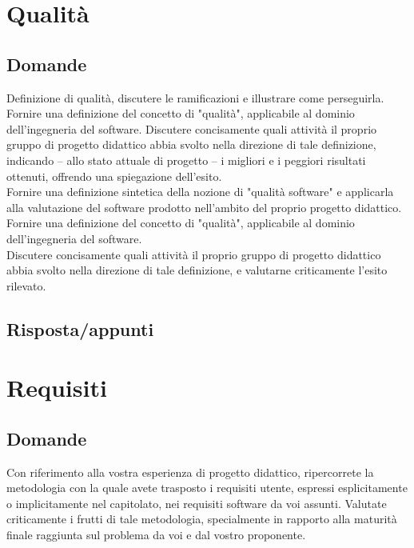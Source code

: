 \section{Qualità}

\subsection*{Domande}
Definizione di qualità, discutere le ramificazioni e illustrare come perseguirla.\\

Fornire una definizione del concetto di "qualità", applicabile al dominio dell'ingegneria del software. 
Discutere concisamente quali attività il proprio gruppo di progetto didattico abbia svolto nella direzione di tale definizione, indicando – allo stato attuale di progetto – i migliori e i peggiori risultati ottenuti, offrendo una spiegazione dell'esito.\\

Fornire una definizione sintetica della nozione di "qualità software" e applicarla alla valutazione del software prodotto nell'ambito del proprio progetto didattico.\\

Fornire una definizione del concetto di "qualità", applicabile al dominio dell'ingegneria del software. \\

Discutere concisamente quali attività il proprio gruppo di progetto didattico abbia svolto nella direzione di tale definizione, e valutarne criticamente l'esito rilevato.

\subsection*{Risposta/appunti}


\section{Requisiti}

\subsection*{Domande}
Con riferimento alla vostra esperienza di progetto didattico, ripercorrete la metodologia con la quale avete trasposto i requisiti utente, espressi esplicitamente o implicitamente nel capitolato, nei requisiti software da voi assunti.
Valutate criticamente i frutti di tale metodologia, specialmente in rapporto alla maturità finale raggiunta sul problema da voi e dal vostro proponente.\\

